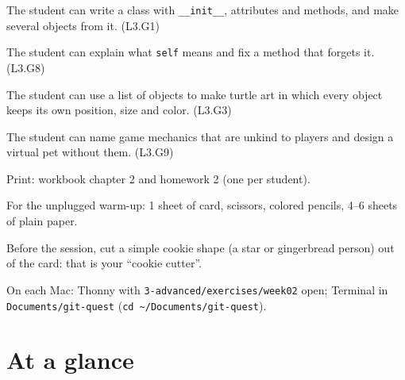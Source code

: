 
\begin{objectives}
  \item The student can write a class with \texttt{\_\_init\_\_}, attributes and methods, and make several objects from it. (L3.G1)
  \item The student can explain what \texttt{self} means and fix a method that forgets it. (L3.G8)
  \item The student can use a list of objects to make turtle art in which every object keeps its own position, size and color. (L3.G3)
  \item The student can name game mechanics that are unkind to players and design a virtual pet without them. (L3.G9)
\end{objectives}

\begin{materials}
  \item Print: workbook chapter 2 and homework 2 (one per student).
  \item For the unplugged warm-up: 1 sheet of card, scissors, colored pencils, 4--6 sheets of plain paper.
  \item Before the session, cut a simple cookie shape (a star or gingerbread person) out of the card: that is your \enquote{cookie cutter}.
  \item On each Mac: Thonny with \texttt{3-advanced/exercises/week02} open; Terminal in \texttt{Documents/git-quest} (\texttt{cd \textasciitilde/Documents/git-quest}).
\end{materials}

\section{At a glance}
\begin{timeplan}
\end{timeplan}

